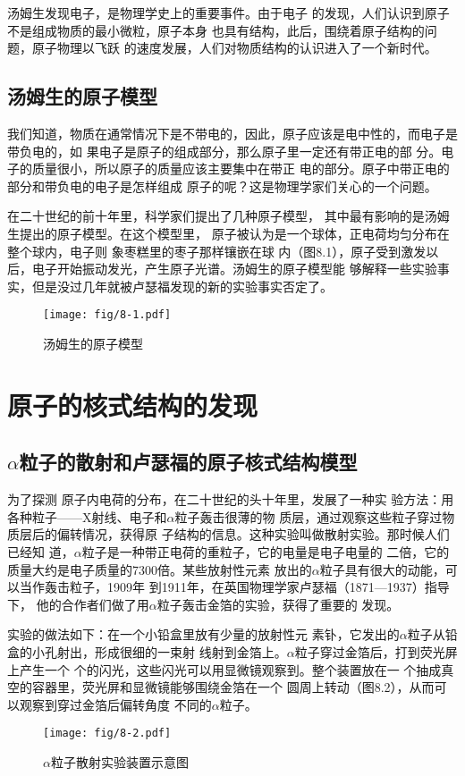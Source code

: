 汤姆生发现电子，是物理学史上的重要事件。由于电子
的发现，人们认识到原子不是组成物质的最小微粒，原子本身
也具有结构，此后，围绕着原子结构的问题，原子物理以飞跃
的速度发展，人们对物质结构的认识进入了一个新时代。

\subsection{汤姆生的原子模型}

我们知道，物质在通常情况下是不带电的，因此，原子应该是电中性的，而电子是带负电的，如
果电子是原子的组成部分，那么原子里一定还有带正电的部
分。电子的质量很小，所以原子的质量应该主要集中在带正
电的部分。原子中带正电的部分和带负电的电子是怎样组成
原子的呢？这是物理学家们关心的一个问题。

在二十世纪的前十年里，科学家们提出了几种原子模型，
其中最有影响的是汤姆生提出的原子模型。在这个模型里，
原子被认为是一个球体，正电荷均匀分布在整个球内，电子则
象枣糕里的枣子那样镶嵌在球
内（图8.1），原子受到激发以后，电子开始振动发光，产生原子光谱。汤姆生的原子模型能
够解释一些实验事实，但是没过几年就被卢瑟福发现的新的实验事实否定了。
\begin{figure}[htp]
    \centering
    \texttt{[image: fig/8-1.pdf]}
    \caption{汤姆生的原子模型}
\end{figure}

\section{原子的核式结构的发现}
\subsection{$\alpha$粒子的散射和卢瑟福的原子核式结构模型} 

为了探测
原子内电荷的分布，在二十世纪的头十年里，发展了一种实
验方法：用各种粒子——X射线、电子和$\alpha$粒子轰击很薄的物
质层，通过观察这些粒子穿过物质层后的偏转情况，获得原
子结构的信息。这种实验叫做散射实验。那时候人们已经知
道，$\alpha$粒子是一种带正电荷的重粒子，它的电量是电子电量的
二倍，它的质量大约是电子质量的7300倍。某些放射性元素
放出的$\alpha$粒子具有很大的动能，可以当作轰击粒子，1909年
到1911年，在英国物理学家卢瑟福（1871—1937）指导下，
他的合作者们做了用$\alpha$粒子轰击金箔的实验，获得了重要的
发现。

实验的做法如下：在一个小铅盒里放有少量的放射性元
素钋，它发出的$\alpha$粒子从铅盒的小孔射出，形成很细的一束射
线射到金箔上。$\alpha$粒子穿过金箔后，打到荧光屏上产生一个
个的闪光，这些闪光可以用显微镜观察到。整个装置放在一
个抽成真空的容器里，荧光屏和显微镜能够围绕金箔在一个
圆周上转动（图8.2），从而可以观察到穿过金箔后偏转角度
不同的$\alpha$粒子。
\begin{figure}[htp]
    \centering
    \texttt{[image: fig/8-2.pdf]}
    \caption{$\alpha$粒子散射实验装置示意图}
\end{figure}

